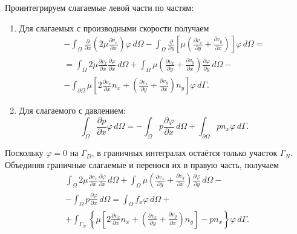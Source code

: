 \documentclass[a4paper,14pt]{extarticle}
\begin{document}
Проинтегрируем слагаемые левой части по частям:
\begin{enumerate}
	\item Для слагаемых с производными скорости получаем
	\begin{equation*}
		\begin{gathered}
			-\int_\Omega
			\frac{\partial}{\partial x}
			\left(
				2\mu\frac{\partial v_x}{\partial x}
			\right)
			\varphi\,d\Omega
			-
			\int_\Omega
			\frac{\partial}{\partial y}
			\left[
				\mu\left(
					\frac{\partial v_x}{\partial y}
					+
					\frac{\partial v_y}{\partial x}
				\right)
			\right]
			\varphi\,d\Omega
			=\\[6pt]
			=
			\int_\Omega
			2\mu
			\frac{\partial v_x}{\partial x}
			\frac{\partial\varphi}{\partial x}\,d\Omega
			+
			\int_\Omega
			\mu\left(
				\frac{\partial v_x}{\partial y}
				+
				\frac{\partial v_y}{\partial x}
			\right)
			\frac{\partial\varphi}{\partial y}\,d\Omega
			-\\[6pt]
			-
			\int_{\partial\Omega}
			\mu\left[
				2\frac{\partial v_x}{\partial x}n_x
				+
				\left(
					\frac{\partial v_x}{\partial y}
					+
					\frac{\partial v_y}{\partial x}
				\right)n_y
			\right]
			\varphi\,d\Gamma.
		\end{gathered}
	\end{equation*}

	\item Для слагаемого с давлением:
	\begin{equation*}
		\int_\Omega
		\frac{\partial p}{\partial x}
		\varphi\,d\Omega
		=
		-\int_\Omega
		p\frac{\partial\varphi}{\partial x}\,d\Omega
		+
		\int_{\partial\Omega}
		pn_x\varphi\,d\Gamma.
	\end{equation*}
\end{enumerate}

Поскольку $\varphi=0$ на $\Gamma_D$, в граничных интегралах
остаётся только участок $\Gamma_N$. Объединяя граничные
слагаемые и перенося их в правую часть, получаем
\begin{equation}
	\begin{gathered}
		\int_\Omega
		2\mu
		\frac{\partial v_x}{\partial x}
		\frac{\partial\varphi}{\partial x}\,d\Omega
		+
		\int_\Omega
		\mu\left(
			\frac{\partial v_x}{\partial y}
			+
			\frac{\partial v_y}{\partial x}
		\right)
		\frac{\partial\varphi}{\partial y}\,d\Omega
		-\\[6pt]
		-
		\int_\Omega
		p\frac{\partial\varphi}{\partial x}\,d\Omega
		=
		\int_\Omega f_x\varphi\,d\Omega
		+\\[6pt]
		+
		\int_{\Gamma_N}
		\left\{
			\mu\left[
				2\frac{\partial v_x}{\partial x}n_x
				+
				\left(
					\frac{\partial v_x}{\partial y}
					+
					\frac{\partial v_y}{\partial x}
				\right)n_y
			\right]
			-pn_x
		\right\}
		\varphi\,d\Gamma.
	\end{gathered}
\end{equation}
\end{document}
